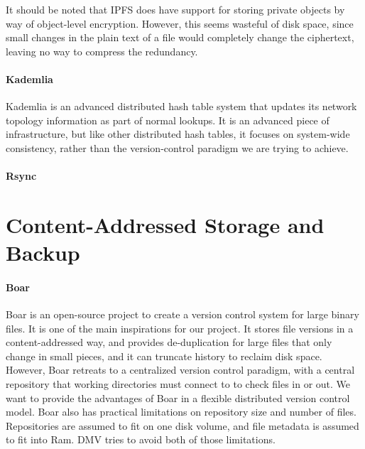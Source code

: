 It should be noted that IPFS does have support for storing private objects by
way of object-level encryption. However, this seems wasteful of disk space,
since small changes in the plain text of a file would completely change the
ciphertext, leaving no way to compress the redundancy.


\paragraph{Kademlia}

Kademlia \cite{Maymounkov2002} is an advanced distributed hash table system that
updates its network topology information as part of normal lookups. It is an
advanced piece of infrastructure, but like other distributed hash tables, it
focuses on system-wide consistency, rather than the version-control paradigm we
are trying to achieve.



\paragraph{Rsync}



\section{Content-Addressed Storage and Backup}

\paragraph{Boar}

Boar \cite{boar_homepage} is an open-source project to create a version control
system for large binary files. It is one of the main inspirations for our
project. It stores file versions in a content-addressed way, and provides
de-duplication for large files that only change in small pieces, and it can
truncate history to reclaim disk space. However, Boar retreats to a centralized
version control paradigm, with a central repository that working directories
must connect to to check files in or out. We want to provide the advantages of
Boar in a flexible distributed version control model. Boar also has practical
limitations on repository size and number of files. Repositories are assumed to
fit on one disk volume, and file metadata is assumed to fit into Ram. \gls{DMV}
tries to avoid both of those limitations.


